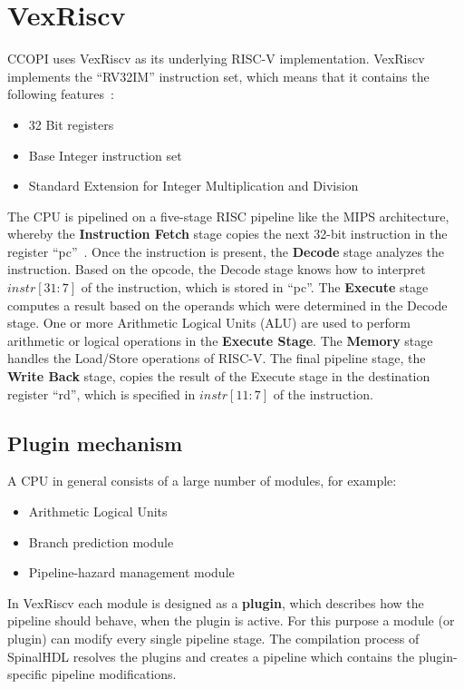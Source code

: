 \documentclass[twoside,twocolumn]{article}
\begin{document}
\section{VexRiscv}
CCOPI uses VexRiscv as its underlying RISC-V implementation. VexRiscv 
implements the ``RV32IM'' instruction set, which means that it contains
the following features~\cite{vexriscv_readme}:
\begin{itemize}
    \item 32 Bit registers
    \item Base Integer instruction set
    \item Standard Extension for Integer
Multiplication and Division
\end{itemize}
The CPU is pipelined on a five-stage RISC pipeline like the MIPS
architecture, whereby the \textbf{Instruction Fetch} stage
copies the next 32-bit instruction in the register ``pc''~\cite[C-34]{computer_architecture}. Once the
instruction is present, the \textbf{Decode} stage analyzes the instruction. 
Based on the opcode,
the Decode stage knows how to interpret $instr[31:7]$ of the
instruction,
which is stored in ``pc''. The \textbf{Execute} stage computes a result
based on the operands which were determined in the Decode stage. One or
more Arithmetic Logical Units (ALU) are used to
perform arithmetic or logical operations in the \textbf{Execute Stage}. 
The \textbf{Memory} stage
handles the Load/Store operations of RISC-V. The final pipeline stage, 
the \textbf{Write Back} stage, copies the result of the Execute stage in
the destination register ``rd'', which is specified in $instr[11:7]$ of
the instruction.
\subsection{Plugin mechanism}
A CPU in general consists of a large number of modules, for example:
\begin{itemize}
    \item Arithmetic Logical Units
    \item Branch prediction module
    \item Pipeline-hazard management module
\end{itemize}
In VexRiscv each module is designed as a \mbox{\textbf{plugin}}, which describes how the
pipeline should behave, when the plugin is active. For this purpose
a module (or plugin) can modify every single pipeline stage. The
compilation process of SpinalHDL resolves the plugins and creates a
pipeline which contains the plugin-specific pipeline
modifications.
\end{document}
